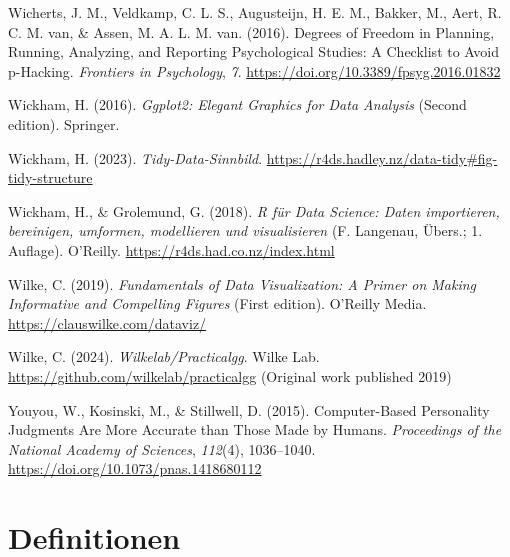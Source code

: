 \documentclass[
  letterpaper,
]{scrbook}
\newlength{\cslhangindent}
\newenvironment{CSLReferences}[2] %
 {\begin{list}{}{%
  \setlength{\itemindent}{0pt}
  \setlength{\leftmargin}{0pt}
  \setlength{\parsep}{0pt}
  \ifodd #1
   \setlength{\leftmargin}{\cslhangindent}
   \setlength{\itemindent}{-1\cslhangindent}
  \fi
  \setlength{\itemsep}{#2\baselineskip}}}
 {\end{list}}
\theoremstyle{definition}
\theoremstyle{definition}
\theoremstyle{definition}
\theoremstyle{remark}
\begin{document}
\begin{CSLReferences}{1}{0}
Wicherts, J. M., Veldkamp, C. L. S., Augusteijn, H. E. M., Bakker, M.,
Aert, R. C. M. van, \& Assen, M. A. L. M. van. (2016). Degrees of
{Freedom} in {Planning}, {Running}, {Analyzing}, and {Reporting
Psychological Studies}: {A Checklist} to {Avoid} p-{Hacking}.
\emph{Frontiers in Psychology}, \emph{7}.
\url{https://doi.org/10.3389/fpsyg.2016.01832}

Wickham, H. (2016). \emph{Ggplot2: Elegant Graphics for Data Analysis}
(Second edition). Springer.

Wickham, H. (2023). \emph{Tidy-{Data-Sinnbild}}.
\url{https://r4ds.hadley.nz/data-tidy\#fig-tidy-structure}

Wickham, H., \& Grolemund, G. (2018). \emph{R für Data Science: Daten
importieren, bereinigen, umformen, modellieren und visualisieren} (F.
Langenau, Übers.; 1. Auflage). O'Reilly.
\url{https://r4ds.had.co.nz/index.html}

Wilke, C. (2019). \emph{Fundamentals of Data Visualization: A Primer on
Making Informative and Compelling Figures} (First edition). O'Reilly
Media. \url{https://clauswilke.com/dataviz/}

Wilke, C. (2024). \emph{Wilkelab/Practicalgg}. Wilke Lab.
\url{https://github.com/wilkelab/practicalgg} (Original work published
2019)

Youyou, W., Kosinski, M., \& Stillwell, D. (2015). Computer-Based
Personality Judgments Are More Accurate than Those Made by Humans.
\emph{Proceedings of the National Academy of Sciences}, \emph{112}(4),
1036--1040. \url{https://doi.org/10.1073/pnas.1418680112}

\end{CSLReferences}

\cleardoublepage
{}
{}
\appendix

\chapter{Definitionen}\label{definitionen}
\end{document}
